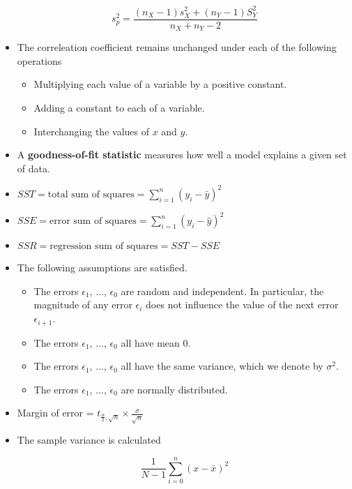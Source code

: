 \documentclass[9pt,landscape]{memoir}
\renewcommand{\hat}{\widehat}
\begin{document}
\begin{multicols}{3}
\begin{itemize}
            \begin{equation*}
                s_p ^2 = \frac{(n_X - 1)s_X ^2 + (n_Y - 1)S_Y^2}{n_X + n_Y - 2}
            \end{equation*}

        \item The correleation coefficient remains unchanged under each of the following operations
            \begin{itemize}
                \item Multiplying each value of a variable by a positive constant.
                \item Adding a constant to each of a variable.
                \item Interchanging the values of $x$ and $y$.
            \end{itemize}

        \vspace{2mm}
        \item A \textbf{goodness-of-fit statistic} measures how well a model explains a given set of data.
        \item $SST = \text{total sum of squares} = \sum_{i = 1} ^n {(y_i - \bar{y})}^2$
        \item $SSE = \text{error sum of squares} = \sum_{i = 1} ^n {(y_i - \hat{y})}^2$
        \item $SSR = \text{regression sum of squares} = SST - SSE$
        \item The following assumptions are satisfied.
            \begin{itemize}
                \item The errors $\epsilon_1$, $\ldots$, $\epsilon_0$ are random and independent. In particular, the magnitude of any error $\epsilon_i$ does not influence the value of the next error $\epsilon_{i + 1}$.
                \item The errors $\epsilon_1$, $\ldots$, $\epsilon_0$ all have mean \num{0}.
                \item The errors $\epsilon_1$, $\ldots$, $\epsilon_0$ all have the same variance, which we denote by $\sigma^2$.
                \item The errors $\epsilon_1$, $\ldots$, $\epsilon_0$ are normally distributed.
            \end{itemize}

        \item Margin of error = $t_{\frac{\alpha}{2}, \sqrt{n}}\times \frac{\sigma}{\sqrt{n}}$
        \item The sample variance is calculated

            \begin{equation*}
                \frac{1}{N - 1} \sum _{i = 0} ^n {\left( x - \bar{x} \right)}^2
            \end{equation*}
    \end{itemize}

\end{multicols}
\end{document}
